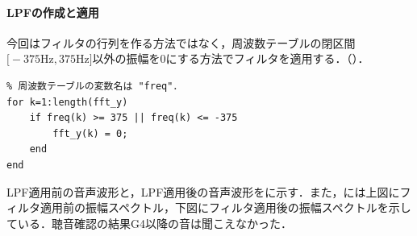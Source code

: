 \paragraph{LPFの作成と適用}
今回はフィルタの行列を作る方法ではなく，周波数テーブルの閉区間\(\big[-375\textrm{Hz},375\textrm{Hz}\big]\)以外の振幅を\(0\)にする方法でフィルタを適用する．（）\scall{}．
\begin{lstlisting}[caption={フィルターを適用する},label={src:フィルターを適用する},numbers={none}]
% データ列yをフーリエ変換後，ffthiftしてabsをとったものを "fft_y" に格納している．
% 周波数テーブルの変数名は "freq"．
for k=1:length(fft_y)
    if freq(k) >= 375 || freq(k) <= -375
        fft_y(k) = 0;
    end
end
\end{lstlisting}
\result
LPF適用前の音声波形と，LPF適用後の音声波形をに示す．また，には上図にフィルタ適用前の振幅スペクトル，下図にフィルタ適用後の振幅スペクトルを示している．聴音確認の結果G4以降の音は聞こえなかった．
